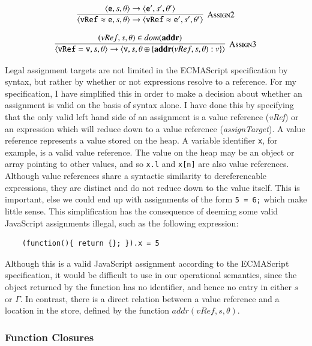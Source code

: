 \documentclass[12pt,a4paper,twoside,openright]{report}
\theoremstyle{definition}
\theoremstyle{dotless}
\newcommand*{\js}{\texttt}
\begin{document}
$$\infer[\textsc{Assign2}]
{
  \langle\mathtt{vRef\approx e},s,\theta\rangle\rightarrow
  \langle\mathtt{vRef\approx e'},s',\theta'\rangle
}{
  \langle\mathtt{e},s, \theta\rangle\rightarrow
  \langle\mathtt{e'}, s', \theta'\rangle
}$$

$$\infer[\textsc{Assign3}]
{
  \langle \mathtt{vRef = v}, s, \theta \rangle \rightarrow
  \langle \mathtt{v}, s, \theta\oplus\{\textbf{addr}(vRef, s, \theta) : v\} \rangle
}
{
  (vRef, s, \theta) \in dom(\textbf{addr})
}$$

Legal assignment targets are not limited in the ECMAScript specification by
syntax, but rather by whether or not expressions resolve to a reference. For my
specification, I have simplified this in order to make a decision about whether
an assignment is valid on the basis of syntax alone. I have done this by
specifying that the only valid left hand side of an assignment is a value
reference (\textit{vRef}) or an expression which will reduce down to a value
reference (\textit{assignTarget}). A value reference represents a value stored
on the heap. A variable identifier \js{x}, for example, is a valid value
reference. The value on the heap may be an object or array pointing to other
values, and so \js{x.l} and \js{x[n]} are also value references. Although value
references share a syntactic similarity to dereferencable expressions, they are
distinct and do not reduce down to the value itself. This is important, else we
could end up with assignments of the form \js{5 = 6;} which make little sense.
This simplification has the consequence of deeming some valid JavaScript
assignments illegal, such as the following expression:
\begin{program}[H]
  \begin{verbatim}
	(function(){ return {}; }).x = 5
  \end{verbatim}
\end{program}
Although this is a valid JavaScript assignment according to the ECMAScript
specification, it would be difficult to use in our operational semantics, since
the object returned by the function has no identifier, and hence no entry in
either $s$ or $\Gamma$. In contrast, there is a direct relation between a value
reference and a location in the store, defined by the function 
$addr(vRef, s, \theta)$.

\subsubsection*{Function Closures}
\end{document}
